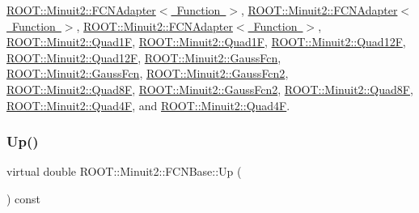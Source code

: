 \mbox{\hyperlink{classROOT_1_1Minuit2_1_1FCNAdapter_a3bcb29efda3b97c17bb17512c1629365}{R\+O\+O\+T\+::\+Minuit2\+::\+F\+C\+N\+Adapter$<$ Function $>$}}, \mbox{\hyperlink{classROOT_1_1Minuit2_1_1FCNAdapter_a3bcb29efda3b97c17bb17512c1629365}{R\+O\+O\+T\+::\+Minuit2\+::\+F\+C\+N\+Adapter$<$ Function $>$}}, \mbox{\hyperlink{classROOT_1_1Minuit2_1_1FCNAdapter_a3bcb29efda3b97c17bb17512c1629365}{R\+O\+O\+T\+::\+Minuit2\+::\+F\+C\+N\+Adapter$<$ Function $>$}}, \mbox{\hyperlink{classROOT_1_1Minuit2_1_1Quad1F_a14469d6031751fa382120df6327da5ee}{R\+O\+O\+T\+::\+Minuit2\+::\+Quad1F}}, \mbox{\hyperlink{classROOT_1_1Minuit2_1_1Quad1F_a14469d6031751fa382120df6327da5ee}{R\+O\+O\+T\+::\+Minuit2\+::\+Quad1F}}, \mbox{\hyperlink{classROOT_1_1Minuit2_1_1Quad12F_afbb216349fbceafc530845fe1cff5af4}{R\+O\+O\+T\+::\+Minuit2\+::\+Quad12F}}, \mbox{\hyperlink{classROOT_1_1Minuit2_1_1Quad12F_afbb216349fbceafc530845fe1cff5af4}{R\+O\+O\+T\+::\+Minuit2\+::\+Quad12F}}, \mbox{\hyperlink{classROOT_1_1Minuit2_1_1GaussFcn_a7e73468f853c287df3b5da240c3b5bb5}{R\+O\+O\+T\+::\+Minuit2\+::\+Gauss\+Fcn}}, \mbox{\hyperlink{classROOT_1_1Minuit2_1_1GaussFcn_a7e73468f853c287df3b5da240c3b5bb5}{R\+O\+O\+T\+::\+Minuit2\+::\+Gauss\+Fcn}}, \mbox{\hyperlink{classROOT_1_1Minuit2_1_1GaussFcn2_aef7172f9af50244bc9fce0c96cc21e81}{R\+O\+O\+T\+::\+Minuit2\+::\+Gauss\+Fcn2}}, \mbox{\hyperlink{classROOT_1_1Minuit2_1_1Quad8F_a8f241ff1340ea2184c7ee9247b8b200a}{R\+O\+O\+T\+::\+Minuit2\+::\+Quad8F}}, \mbox{\hyperlink{classROOT_1_1Minuit2_1_1GaussFcn2_aef7172f9af50244bc9fce0c96cc21e81}{R\+O\+O\+T\+::\+Minuit2\+::\+Gauss\+Fcn2}}, \mbox{\hyperlink{classROOT_1_1Minuit2_1_1Quad8F_a8f241ff1340ea2184c7ee9247b8b200a}{R\+O\+O\+T\+::\+Minuit2\+::\+Quad8F}}, \mbox{\hyperlink{classROOT_1_1Minuit2_1_1Quad4F_a19ebb5413722895a7635626cca02ebe9}{R\+O\+O\+T\+::\+Minuit2\+::\+Quad4F}}, and \mbox{\hyperlink{classROOT_1_1Minuit2_1_1Quad4F_a19ebb5413722895a7635626cca02ebe9}{R\+O\+O\+T\+::\+Minuit2\+::\+Quad4F}}.

\mbox{\label{classROOT_1_1Minuit2_1_1FCNBase_a04ef08ddad92ce8d89d498efbe021c39}} 
\subsubsection{\texorpdfstring{Up()}{Up()}\hspace{0.1cm}{\footnotesize\ttfamily [3/3]}}
{\footnotesize\ttfamily virtual double R\+O\+O\+T\+::\+Minuit2\+::\+F\+C\+N\+Base\+::\+Up (\begin{DoxyParamCaption}{ }\end{DoxyParamCaption}) const\hspace{0.3cm}{\ttfamily [pure virtual]}}

